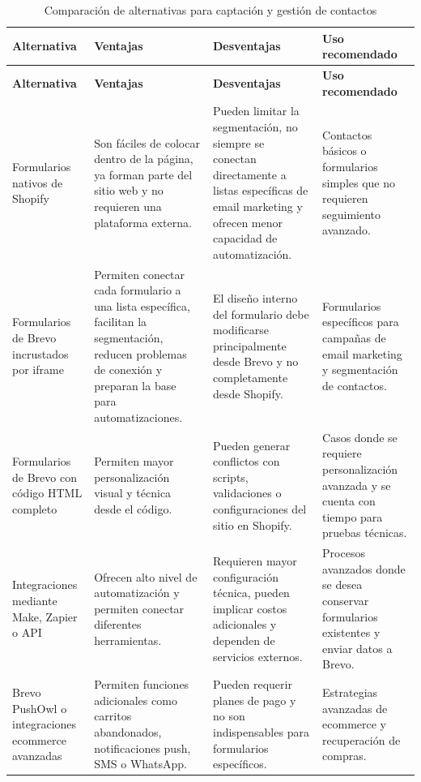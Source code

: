 \begin{longtable}{|p{3.2cm}|p{4cm}|p{4cm}|p{3.5cm}|}
\caption{Comparación de alternativas para captación y gestión de contactos} \\
\hline
\textbf{Alternativa} & \textbf{Ventajas} & \textbf{Desventajas} & \textbf{Uso recomendado} \\ \hline
\endfirsthead

\hline
\textbf{Alternativa} & \textbf{Ventajas} & \textbf{Desventajas} & \textbf{Uso recomendado} \\ \hline
\endhead

Formularios nativos de Shopify & Son fáciles de colocar dentro de la página, ya forman parte del sitio web y no requieren una plataforma externa. & Pueden limitar la segmentación, no siempre se conectan directamente a listas específicas de email marketing y ofrecen menor capacidad de automatización. & Contactos básicos o formularios simples que no requieren seguimiento avanzado. \\ \hline

Formularios de Brevo incrustados por iframe & Permiten conectar cada formulario a una lista específica, facilitan la segmentación, reducen problemas de conexión y preparan la base para automatizaciones. & El diseño interno del formulario debe modificarse principalmente desde Brevo y no completamente desde Shopify. & Formularios específicos para campañas de email marketing y segmentación de contactos. \\ \hline

Formularios de Brevo con código HTML completo & Permiten mayor personalización visual y técnica desde el código. & Pueden generar conflictos con scripts, validaciones o configuraciones del sitio en Shopify. & Casos donde se requiere personalización avanzada y se cuenta con tiempo para pruebas técnicas. \\ \hline

Integraciones mediante Make, Zapier o API & Ofrecen alto nivel de automatización y permiten conectar diferentes herramientas. & Requieren mayor configuración técnica, pueden implicar costos adicionales y dependen de servicios externos. & Procesos avanzados donde se desea conservar formularios existentes y enviar datos a Brevo. \\ \hline

Brevo PushOwl o integraciones ecommerce avanzadas & Permiten funciones adicionales como carritos abandonados, notificaciones push, SMS o WhatsApp. & Pueden requerir planes de pago y no son indispensables para formularios específicos. & Estrategias avanzadas de ecommerce y recuperación de compras. \\ \hline

\end{longtable}

